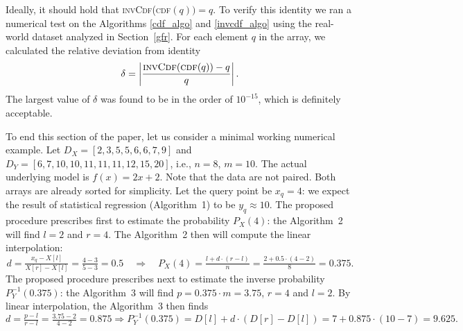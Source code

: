 \documentclass[10pt,final]{siamltex}
\begin{document}
Ideally, it should hold that \textsc{invCdf}(\textsc{cdf}$(q))=q$. To verify this identity we ran a numerical test on the Algorithms \ref{cdf_algo} and \ref{invcdf_algo} using the real-world dataset analyzed in Section~\ref{gfr}. For each element $q$ in the array, we calculated the relative deviation from identity
%
\begin{equation}
\delta = \left|\frac{\ensuremath{\textsc{invCdf}(\textsc{cdf}}(q)) - q}{q}\right|.
\end{equation}
%
The largest value of $\delta$ was found to be in the order of $10^{-15}$, which is definitely acceptable. %


To end this section of the paper, let us consider a minimal working numerical example. Let $D_X=[2,3,5,5,6,6,7,9]$ and $D_Y=[6,7,10,10,11,11,11,12,15,20]$, i.e., $n=8$, $m=10$. The actual underlying model is $f(x)=2x+2$. Note that the data are not paired. Both arrays are already sorted for simplicity. Let the query point be $x_q=4$: we expect the result of statistical regression (Algorithm~1) to be $y_q\approx10$. The proposed procedure prescribes first to estimate the probability $P_X(4)$: the Algorithm~2 will find $l=2$ and $r=4$. The Algorithm~2 then will compute the linear interpolation:
%
  \begin{equation*}
    d = \tfrac{x_q-X[l]}{X[r]-X[l]} = \tfrac{4-3}{5-3} = 0.5 \quad\Rightarrow\quad
    P_X(4)=\tfrac{l+d\cdot(r-l)}{n}=\tfrac{2+0.5\cdot(4-2)}{8}=0.375.
  \end{equation*}
%
The proposed procedure prescribes next to estimate the inverse probability $P^{-1}_Y(0.375)$: the Algorithm~3 will find $p = 0.375\cdot m=3.75$, $r=4$ and $l=2$. By linear interpolation, the Algorithm~3 then finds
%
  \begin{equation*}
    d = \tfrac{p-l}{r-l} = \tfrac{3.75-2}{4-2} = 0.875 \Rightarrow
    P^{-1}_Y(0.375)=D[l]+d\cdot(D[r]-D[l])=7+0.875\cdot(10-7)=9.625.
  \end{equation*}
%
%
\end{document}
